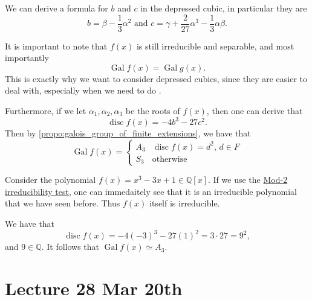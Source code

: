 \documentclass[notoc,notitlepage,nobib]{tufte-book}
\DeclareMathOperator{\disc}{disc}
\DeclareMathOperator{\Gal}{Gal}
\begin{document}
\begin{note}
  We can derive a formula for $b$ and $c$ in the depressed cubic, in particular
  they are
  \begin{equation*}
    b = \beta - \frac{1}{3} \alpha^2 \text{ and } c = \gamma + \frac{2}{27}
    \alpha^3 - \frac{1}{3} \alpha\beta.
  \end{equation*}

  It is important to note that $f(x)$ is still irreducible and separable, and
  most importantly
  \begin{equation*}
    \Gal f(x) = \Gal g(x).
  \end{equation*}
  This is exactly why we want to consider depressed cubics, since they are
  easier to deal with, especially when we need to do .

  Furthermore, if we let $\alpha_1, \alpha_2, \alpha_3$ be the roots of $f(x)$,
  then one can derive that
  \begin{equation*}
    \disc f(x) = -4b^3 - 27c^2.
  \end{equation*}
  Then by \cref{propo:galois_group_of_finite_extensions}, we have that
  \begin{equation*}
    \Gal f(x) = \begin{cases}
      A_3 & \disc f(x) = d^2, \, d \in F \\
      S_3 & \text{otherwise }
    \end{cases}
  \end{equation*}
\end{note}

\begin{eg}
  Consider the polynomial $f(x) = x^3 - 3x + 1 \in \mathbb{Q}[x]$. If we use the
  \hyperref[propo:mod_p_irreducibility_test]{Mod-2 irreducibility test}, one can
  immedaitely see that it is an irreducible polynomial that we have seen before.
  Thus $f(x)$ itself is irreducible.

  We have that
  \begin{equation*}
    \disc f(x) = -4(-3)^3 - 27(1)^2 = 3 \cdot 27 = 9^2,
  \end{equation*}
  and $9 \in \mathbb{Q}$. It follows that $\Gal f(x) \simeq A_3$.
\end{eg}




\chapter{Lecture 28 Mar 20th}%
\label{chp:lecture_28_mar_20th}
\end{document}

